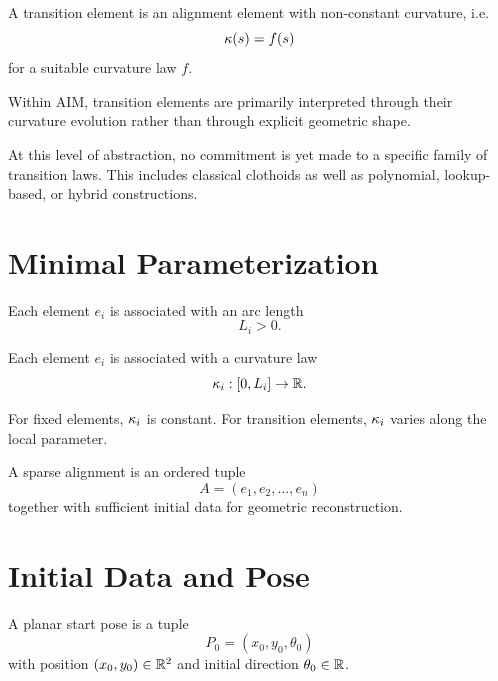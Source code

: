 \begin{definition}
A transition element is an alignment element with non-constant
curvature, i.e.
\[
\kappa(s)=f(s)
\]
for a suitable curvature law $f$.
\end{definition}

Within AIM, transition elements are primarily interpreted through their
curvature evolution rather than through explicit geometric shape.

At this level of abstraction, no commitment is yet made to a specific
family of transition laws.
This includes classical clothoids as well as polynomial, lookup-based,
or hybrid constructions.


\section{Minimal Parameterization}

\begin{definition}
Each element $e_i$ is associated with an arc length
\[
L_i > 0.
\]
\end{definition}

\begin{definition}
Each element $e_i$ is associated with a curvature law
\[
\kappa_i : [0,L_i] \to \mathbb{R}.
\]
\end{definition}

For fixed elements, $\kappa_i$ is constant.
For transition elements, $\kappa_i$ varies along the local parameter.

\begin{definition}
A sparse alignment is an ordered tuple
\[
A=(e_1,e_2,\dots,e_n)
\]
together with sufficient initial data for geometric reconstruction.
\end{definition}

\section{Initial Data and Pose}

\begin{definition}
A planar start pose is a tuple
\[
P_0=(x_0,y_0,\theta_0)
\]
with position $(x_0,y_0)\in\mathbb{R}^2$ and initial direction
$\theta_0\in\mathbb{R}$.
\end{definition}

